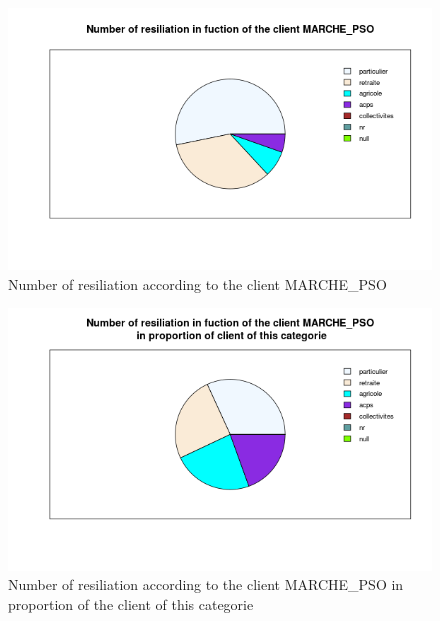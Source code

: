 \documentclass[a4paper, 11pt]{article}
\begin{document}
                \begin{figure}[!ht]
        	\centering
                \includegraphics[height = 10 cm]{Valentin/Number_of_resiliation_in_fuction_of_the_client_MARCHE_PSO.png}
                \caption{Number of resiliation according to the client MARCHE\_PSO}
                \label{fig:resiliation_pso1}
        \end{figure}
        
        \begin{figure}[!ht]
        	\centering
                \includegraphics[height = 10 cm]{Valentin/Number_of_resiliation_in_fuction_of_the_client_MARCHE_PSO_proportion.png}
                \caption{Number of resiliation according to the client MARCHE\_PSO in proportion of the client of this categorie}
                \label{fig:resiliation_pso2}
        \end{figure}
        
\end{document}
